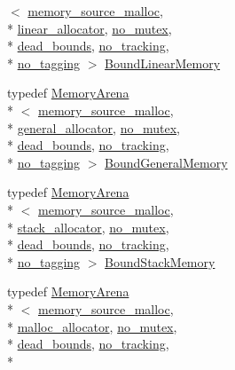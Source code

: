 \begin{DoxyCompactItemize}
$<$ \hyperlink{classcrap_1_1memory__source__malloc}{memory\+\_\+source\+\_\+malloc}, \\*
\hyperlink{classcrap_1_1linear__allocator}{linear\+\_\+allocator}, \hyperlink{structcrap_1_1no__mutex}{no\+\_\+mutex}, \\*
\hyperlink{structcrap_1_1dead__bounds}{dead\+\_\+bounds}, \hyperlink{structcrap_1_1no__tracking}{no\+\_\+tracking}, \\*
\hyperlink{structcrap_1_1no__tagging}{no\+\_\+tagging} $>$ \hyperlink{namespacecrap_aa20da4e8cbab540052136fe0dc25815c}{Bound\+Linear\+Memory}
\item 
typedef \hyperlink{classcrap_1_1_memory_arena}{Memory\+Arena}\\*
$<$ \hyperlink{classcrap_1_1memory__source__malloc}{memory\+\_\+source\+\_\+malloc}, \\*
\hyperlink{classcrap_1_1general__allocator}{general\+\_\+allocator}, \hyperlink{structcrap_1_1no__mutex}{no\+\_\+mutex}, \\*
\hyperlink{structcrap_1_1dead__bounds}{dead\+\_\+bounds}, \hyperlink{structcrap_1_1no__tracking}{no\+\_\+tracking}, \\*
\hyperlink{structcrap_1_1no__tagging}{no\+\_\+tagging} $>$ \hyperlink{namespacecrap_aaff1250c80e3631796871d2e94b4d187}{Bound\+General\+Memory}
\item 
typedef \hyperlink{classcrap_1_1_memory_arena}{Memory\+Arena}\\*
$<$ \hyperlink{classcrap_1_1memory__source__malloc}{memory\+\_\+source\+\_\+malloc}, \\*
\hyperlink{classcrap_1_1stack__allocator}{stack\+\_\+allocator}, \hyperlink{structcrap_1_1no__mutex}{no\+\_\+mutex}, \\*
\hyperlink{structcrap_1_1dead__bounds}{dead\+\_\+bounds}, \hyperlink{structcrap_1_1no__tracking}{no\+\_\+tracking}, \\*
\hyperlink{structcrap_1_1no__tagging}{no\+\_\+tagging} $>$ \hyperlink{namespacecrap_af1fa4a94e1cfd326b0c488a328e154a3}{Bound\+Stack\+Memory}
\item 
typedef \hyperlink{classcrap_1_1_memory_arena}{Memory\+Arena}\\*
$<$ \hyperlink{classcrap_1_1memory__source__malloc}{memory\+\_\+source\+\_\+malloc}, \\*
\hyperlink{classcrap_1_1malloc__allocator}{malloc\+\_\+allocator}, \hyperlink{structcrap_1_1no__mutex}{no\+\_\+mutex}, \\*
\hyperlink{structcrap_1_1dead__bounds}{dead\+\_\+bounds}, \hyperlink{structcrap_1_1no__tracking}{no\+\_\+tracking}, \\*

\end{DoxyCompactItemize}

